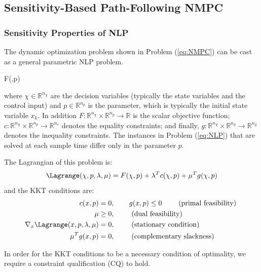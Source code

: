 \documentclass{article}
\theoremstyle{example}
\theoremstyle{definition}
\theoremstyle{assumption}
\theoremstyle{lemma}
\begin{document}
\subsection{Sensitivity-Based Path-Following NMPC}
\subsubsection{Sensitivity Properties of NLP}
The dynamic optimization problem shown in Problem (\ref{eq:NMPC}) can be cast as a general parametric NLP problem.
	\begin{mini!}
		{\chi}{F(\chi,p)}{}{}
		\label{eq:NLP}
	\end{mini!}
	where $\chi\in\mathbb{R}^{n_\chi}$ are the decision variables (typically the state variables and the control input) and $p\in\mathbb{R}^{n_p}$ is the parameter, which is typically the initial state variable $x_k$.
	In addition $F:\mathbb{R}^{n_\chi}\times\mathbb{R}^{n_p}\rightarrow\mathbb{R}$ is the scalar objective function; $c:\mathbb{R}^{n_\chi}\times\mathbb{R}^{n_p}\rightarrow\mathbb{R}^{n_c}$ denotes the equality constraints; and finally, $g:\mathbb{R}^{n_\chi}\times\mathbb{R}^{n_p}\rightarrow\mathbb{R}^{n_g}$ denotes the inequality constraints.
	The instances in Problem (\ref{eq:NLP}) that are solved at each sample time differ only in the parameter $p$.
	\par
	The Lagrangian of this problem is:
	\begin{equation}
		\Lagrange(\chi,p,\lambda,\mu)=F(\chi,p)+\lambda^Tc(\chi,p)+\mu^Tg(\chi,p)
	\end{equation}
	and the KKT conditions are:
	\begin{align}
		c(x,p)&=0,\qquad g(x,p)\leq 0 \qquad \text{ (primal feasibility) }\label{eq:primal}\\
		\mu&\geq0, \qquad \text{ (dual feasibility) }\nonumber\\
		\nabla_x\Lagrange(x,p,\lambda,\mu)&=0, \qquad \text{ (stationary condition) }\nonumber\\
		\mu^Tg(x,p)&=0, \qquad \text{ (complementary slackness) }\nonumber
	\end{align}
	\par
	In order for the KKT conditions to be a necessary condition of optimality, we require a constraint qualification (CQ) to hold.
\end{document}
